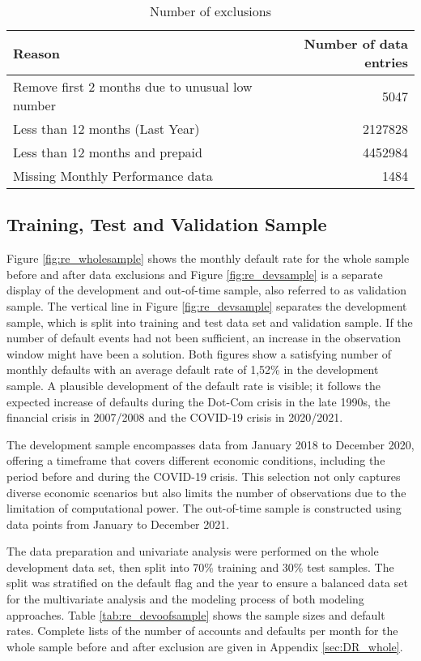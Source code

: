 \begin{table}[H]
\centering
\begin{tabular}{ l r }\toprule          										
\textbf{Reason}                                       	& \textbf{Number of data entries} 	\\\midrule
Remove first 2 months due to unusual low number 		& 5047                   			\\
Less than 12 months (Last Year)                 		& 2127828                			\\
Less than 12 months and prepaid                 		& 4452984                			\\
Missing Monthly Performance data                		& 1484  				 			\\\bottomrule
\end{tabular}%
\caption{Number of exclusions}
\label{tab:re_nr_excl}
\end{table}

\subsection{Training, Test and Validation Sample}
Figure \ref{fig:re_wholesample} shows the monthly default rate for the whole sample before and after data exclusions and Figure \ref{fig:re_devsample} is a separate display of the development and out-of-time sample, also referred to as validation sample. The vertical line in Figure \ref{fig:re_devsample} separates the development sample, which is split into training and test data set and validation sample. If the number of default events had not been sufficient, an increase in the observation window might have been a solution. Both figures show a satisfying number of monthly defaults with an average default rate of 1,52\% in the development sample. A plausible development of the default rate is visible; it follows the expected increase of defaults during the Dot-Com crisis in the late 1990s, the financial crisis in 2007/2008 and the COVID-19 crisis in 2020/2021. 

The development sample encompasses data from January 2018 to December 2020, offering a timeframe that covers different economic conditions, including the period before and during the COVID-19 crisis. This selection not only captures diverse economic scenarios but also limits the number of observations due to the limitation of computational power. The out-of-time sample is constructed using data points from January to December 2021. 

The data preparation and univariate analysis were performed on the whole development data set, then split into 70\% training and 30\% test samples. The split was stratified on the default flag and the year to ensure a balanced data set for the multivariate analysis and the modeling process of both modeling approaches. Table \ref{tab:re_devoofsample} shows the sample sizes and default rates. Complete lists of the number of accounts and defaults per month for the whole sample before and after exclusion are given in Appendix \ref{sec:DR_whole}.

